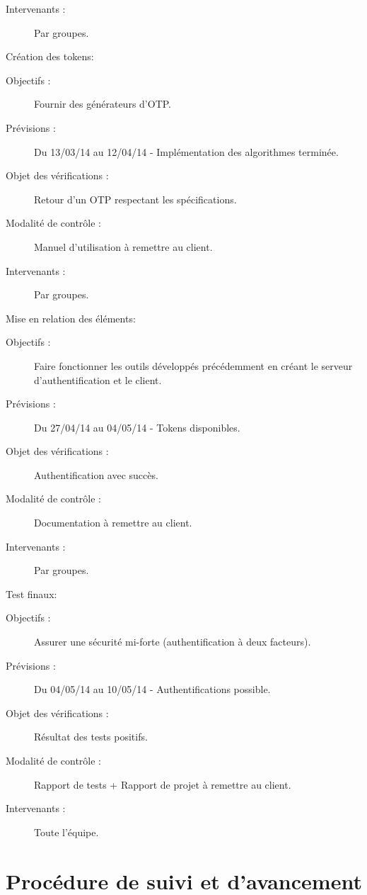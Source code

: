 \documentclass{../../res/univ-projet}
\begin{document}
\begin{description}
\begin{description}
		\item[Intervenants :] Par groupes.
	\end{description}
	\vfill
	\item Création des tokens:
	\begin{description}
		\item[Objectifs :] Fournir des générateurs d'OTP.
		\item[Prévisions :] Du 13/03/14 au 12/04/14 - Implémentation des algorithmes terminée.
		\item[Objet des vérifications :] Retour d'un OTP respectant les spécifications.
		\item[Modalité de contrôle :] Manuel d'utilisation à remettre au client.
		\item[Intervenants :] Par groupes.
	\end{description}
	\vfill
	\item Mise en relation des éléments:
	\begin{description}
		\item[Objectifs :] Faire fonctionner les outils développés précédemment en créant le serveur d'authentification et le client.
		\item[Prévisions :] Du 27/04/14 au 04/05/14 - Tokens disponibles.
		\item[Objet des vérifications :] Authentification avec succès.
		\item[Modalité de contrôle :] Documentation à remettre au client.
		\item[Intervenants :] Par groupes.
	\end{description}
	\vfill
	\item Test finaux:
	\begin{description}
		\item[Objectifs :] Assurer une sécurité mi-forte (authentification à deux facteurs).
		\item[Prévisions :] Du 04/05/14 au 10/05/14 - Authentifications possible.
		\item[Objet des vérifications :] Résultat des tests positifs.
		\item[Modalité de contrôle :] Rapport de tests + Rapport de projet à remettre au client.
		\item[Intervenants :] Toute l'équipe.
	\end{description}
	\vfill
\end{description}
\section{Procédure de suivi et d'avancement}
\end{document}
